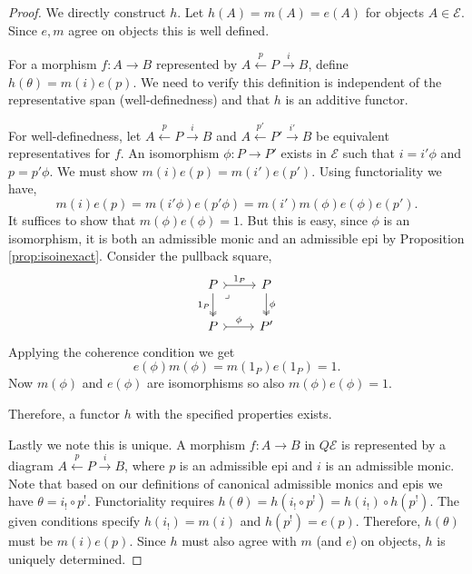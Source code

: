 \documentclass[12pt]{report}
\numberwithin{equation}{section}
\begin{document}
		\begin{proof}
			We directly construct \( h \). Let \( h(A) = m(A)= e(A) \) for objects \( A \in \mathcal{E} \). Since \( e,m \) agree on objects this is well defined. 
			
			For a morphism \( f: A \to B \) represented by \( A \xleftarrow{p} P \xrightarrow{i} B \), define \( h(\theta) = m(i) e(p) \). We need to verify this definition is independent of the representative span (well-definedness) and that \( h \) is an additive functor.
			
			For well-definedness, let \( A \xleftarrow{p} P \xrightarrow{i} B \) and \( A \xleftarrow{p'} P' \xrightarrow{i'} B \) be equivalent representatives for \( f \). An isomorphism \( \phi: P \to P' \) exists in \( \mathcal{E} \) such that \( i = i' \phi \) and \( p = p' \phi \). We must show \( m(i)e(p) = m(i')e(p') \). Using functoriality we have,
			\[ m(i)e(p) = m(i'\phi)e(p'\phi) = m(i')m(\phi) e(\phi)e(p').\]
			It suffices to show that \( m(\phi) e(\phi)=1 \).
			But this is easy, since \( \phi \) is an isomorphism, it is both an admissible monic and an admissible epi by Proposition \ref{prop:isoinexact}. Consider the pullback square,
		\[\begin{tikzcd}
			P & P \\
			P & {P'}
			\arrow["{1_P}", tail, from=1-1, to=1-2]
			\arrow["{1_P}"', two heads, from=1-1, to=2-1]
			\arrow["\phi", two heads, from=1-2, to=2-2]
			\arrow["\phi", tail, from=2-1, to=2-2]
			\arrow["\lrcorner"{anchor=center, pos=0.125}, draw=none, from=1-1, to=2-2]
		\end{tikzcd}\]
			Applying the coherence condition we get
			\[ e(\phi)m(\phi) = m(1_P)e(1_P) = 1. \]
			Now \( m(\phi) \) and \( e(\phi) \) are isomorphisms so also \( m(\phi)e(\phi) = 1 \). 
			
			Therefore, a functor \( h \) with the specified properties exists.
			
			Lastly we note this is unique. A morphism \( f: A \to B \) in \( Q\mathcal{E} \) is represented by a diagram \( A \xleftarrow{p} P \xrightarrow{i} B \), where \( p \) is an admissible epi and \( i \) is an admissible monic. Note that based on our definitions of canonical admissible monics and epis we have \( \theta = i_! \circ p^! \). Functoriality requires \( h(\theta) = h(i_! \circ p^!) = h(i_!) \circ h(p^!) \). The given conditions specify \( h(i_!) = m(i) \) and \( h(p^!) = e(p) \). Therefore, \( h(\theta) \) must be \( m(i) e(p) \). Since \( h \) must also agree with \( m \) (and \( e \)) on objects, \( h \) is uniquely determined.
		\end{proof}
		
\end{document}
